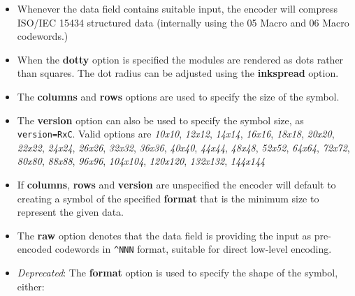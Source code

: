 \begin{itemize}
  \begin{itemize}
  \tightlist
  \item
    \texttt{\^{}FNC1}: FNC1. \emph{Recommendation: Use
    \protect\hyperlink{gs1-datamatrix}{GS1 DataMatrix} for encoding GS1
    AI syntax data.}
  \item
    \texttt{\^{}PROG}: PROG - Reader programming
  \item
    \texttt{\^{}ECI000000} to \texttt{\^{}ECI999999}: ECI indicators
  \end{itemize}
\item
  Whenever the data field contains suitable input, the encoder will
  compress ISO/IEC 15434 structured data (internally using the 05 Macro
  and 06 Macro codewords.)
\item
  When the \textbf{dotty} option is specified the modules are rendered
  as dots rather than squares. The dot radius can be adjusted using the
  \textbf{inkspread} option.
\item
  The \textbf{columns} and \textbf{rows} options are used to specify the
  size of the symbol.
\item
  The \textbf{version} option can also be used to specify the symbol
  size, as \texttt{version=RxC}. Valid options are \emph{10x10},
  \emph{12x12}, \emph{14x14}, \emph{16x16}, \emph{18x18}, \emph{20x20},
  \emph{22x22}, \emph{24x24}, \emph{26x26}, \emph{32x32}, \emph{36x36},
  \emph{40x40}, \emph{44x44}, \emph{48x48}, \emph{52x52}, \emph{64x64},
  \emph{72x72}, \emph{80x80}, \emph{88x88}, \emph{96x96},
  \emph{104x104}, \emph{120x120}, \emph{132x132}, \emph{144x144}
\item
  If \textbf{columns}, \textbf{rows} and \textbf{version} are
  unspecified the encoder will default to creating a symbol of the
  specified \textbf{format} that is the minimum size to represent the
  given data.
\item
  The \textbf{raw} option denotes that the data field is providing the
  input as pre-encoded codewords in \texttt{\^{}NNN} format, suitable
  for direct low-level encoding.
\item
  \emph{Deprecated}: The \textbf{format} option is used to specify the
  shape of the symbol, either:


\end{itemize}
